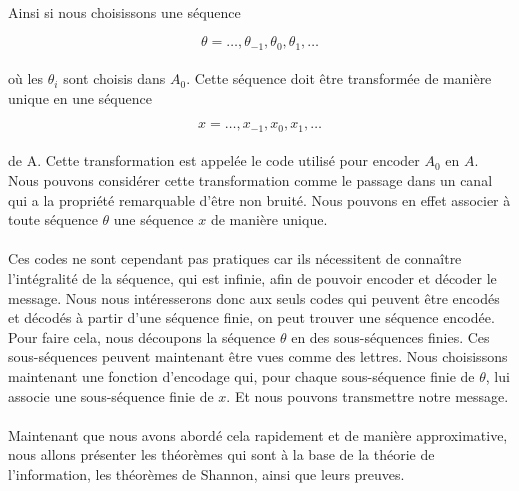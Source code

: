 	\paragraph{}
	Ainsi si nous choisissons une séquence

	\[\theta = \dots,\theta_{-1},\theta_{0},\theta_{1},\dots\]

	\paragraph{}
	où les $\theta_i$ sont choisis dans $A_0$. Cette séquence doit être transformée de manière unique en une séquence

	\[x = \dots,x_{-1},x_{0},x_{1},\dots\]

	\paragraph{}
	de A. Cette transformation est appelée le code utilisé pour encoder $A_0$ en $A$. Nous pouvons considérer cette 
	transformation comme le passage dans un canal qui a la propriété remarquable d'être non bruité.
	Nous pouvons en effet associer à toute séquence $\theta$ une séquence $x$ de manière unique. 

	\paragraph{}
	Ces codes ne sont cependant pas pratiques car ils nécessitent de connaître l'intégralité de la séquence, qui est 
	infinie, afin de pouvoir encoder et décoder le message. Nous  nous intéresserons donc aux seuls codes qui peuvent être encodés et 
	décodés à partir d'une séquence 
	finie, on peut trouver une séquence encodée. Pour faire cela, nous découpons la séquence $\theta$ en des sous-séquences finies. 
	Ces sous-séquences peuvent maintenant être vues comme des lettres. Nous choisissons maintenant une fonction d'encodage qui, pour 
	chaque sous-séquence finie de $\theta$, lui associe une sous-séquence finie de $x$. Et nous pouvons transmettre notre message.
	
	\paragraph{}
	Maintenant que nous avons abordé cela rapidement et de manière 
	approximative, nous allons présenter les théorèmes qui sont à la base
	de la théorie de l'information, les théorèmes
	de Shannon, ainsi que leurs preuves.


